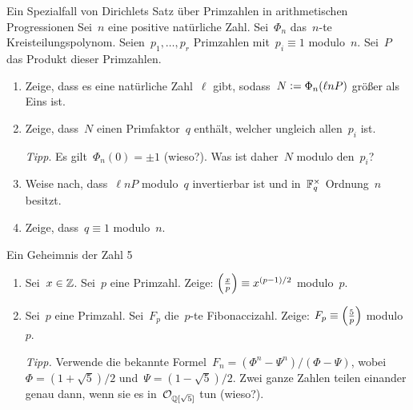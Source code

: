 \documentclass{uebblatt}
\begin{document}
\begin{aufgabe}{Ein Spezialfall von Dirichlets Satz über Primzahlen in arithmetischen
Progressionen}
Sei~$n$ eine positive natürliche Zahl. Sei~$\Phi_n$ das~$n$-te
Kreisteilungspolynom. Seien~$p_1,\ldots,p_r$ Primzahlen
mit~$p_i \equiv 1$ modulo~$n$. Sei~$P$ das Produkt dieser Primzahlen.
\begin{enumerate}
\item Zeige, dass es eine natürliche Zahl~$\ell$ gibt, sodass~$N \vcentcolon=
\Phi_n(\ell n P)$ größer als Eins ist.
\item Zeige, dass~$N$ einen Primfaktor~$q$ enthält, welcher ungleich
allen~$p_i$ ist.

{\tiny\emph{Tipp}. Es gilt~$\Phi_n(0) = \pm1$ (wieso?). Was ist daher~$N$
modulo den~$p_i$?\par}
\item Weise nach, dass~$\ell n P$ modulo~$q$ invertierbar ist und in~$\mathbb{F}_q^\times$
Ordnung~$n$ besitzt.
\item Zeige, dass~$q \equiv 1$ modulo~$n$.
\end{enumerate}
\end{aufgabe}

\begin{aufgabe}{Ein Geheimnis der Zahl 5}
\begin{enumerate}
\item Sei~$x \in \mathbb{Z}$. Sei~$p$ eine Primzahl. Zeige: $\left(\frac{x}{p}\right) \equiv
x^{(p-1)/2}$ modulo~$p$.
\item Sei~$p$ eine Primzahl. Sei~$F_p$ die~$p$-te Fibonaccizahl. Zeige: $F_p
\equiv \left(\frac{5}{p}\right)$ modulo~$p$.

{\tiny\emph{Tipp.} Verwende die bekannte Formel~$F_n = (\Phi^n - \Psi^n) /
(\Phi - \Psi)$, wobei~$\Phi = (1 + \sqrt{5})/2$ und~$\Psi = (1 - \sqrt{5})/2$.
Zwei ganze Zahlen teilen einander genau dann, wenn sie es
in~$\mathcal{O}_{\mathbb{Q}[\sqrt{5}]}$ tun (wieso?).\par}
\end{enumerate}
\end{aufgabe}
\end{document}
